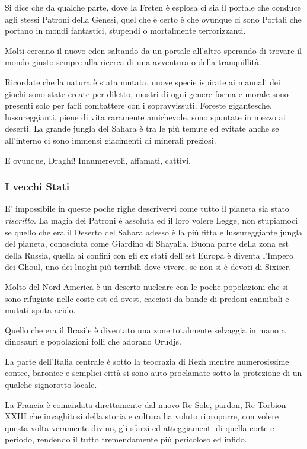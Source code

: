 \begin{multicols}{2}
Si dice che da qualche parte, dove la Freten è esplosa ci sia il portale che conduce agli stessi Patroni della Genesi, quel che è certo è che ovunque ci sono Portali che portano in mondi fantastici, stupendi o mortalmente terrorizzanti.

Molti cercano il nuovo eden saltando da un portale all'altro sperando di trovare il mondo giusto sempre alla ricerca di una avventura o della tranquillità.

Ricordate che la natura è stata mutata, nuove specie ispirate ai manuali dei giochi sono state create per diletto, mostri di ogni genere forma e morale sono presenti solo per farli combattere con i sopravvissuti. Foreste gigantesche, lussureggianti, piene di vita raramente amichevole, sono spuntate in mezzo ai deserti. La grande jungla del Sahara è tra le più temute ed evitate anche se all'interno ci sono immensi giacimenti di minerali preziosi.

E ovunque, Draghi! Innumerevoli, affamati, cattivi.

\subsubsection{I vecchi Stati}

E' impossibile in queste poche righe descrivervi come tutto il pianeta sia stato \emph{riscritto}. La magia dei Patroni è assoluta ed il loro volere Legge, non stupiamoci se quello che era il Deserto del Sahara adesso è la più fitta e lussureggiante jungla del pianeta, conosciuta come Giardino di Shayalia.
Buona parte della zona est della Russia, quella ai confini con gli ex stati dell'est Europa è diventa l'Impero dei Ghoul, uno dei luoghi più terribili dove vivere, se non si è devoti di Sixiser.

Molto del Nord America è un deserto nucleare con le poche popolazioni che si sono rifugiate nelle coste est ed ovest, cacciati da bande di predoni cannibali e mutati sputa acido.

Quello che era il Brasile è diventato una zone totalmente selvaggia in mano a dinosauri e popolazioni folli che adorano Orudjs.

La parte dell'Italia centrale è sotto la teocrazia di Rezh mentre numerosissime contee, baroniee e semplici città si sono auto proclamate sotto la protezione di un qualche signorotto locale.

La Francia è comandata direttamente dal nuovo Re Sole, pardon, Re Torbion XXIII che invaghitosi della storia e cultura ha voluto riproporre, con volere questa volta veramente divino, gli sfarzi ed atteggiamenti di quella corte e periodo, rendendo il tutto tremendamente più pericoloso ed infido.


\end{multicols}
